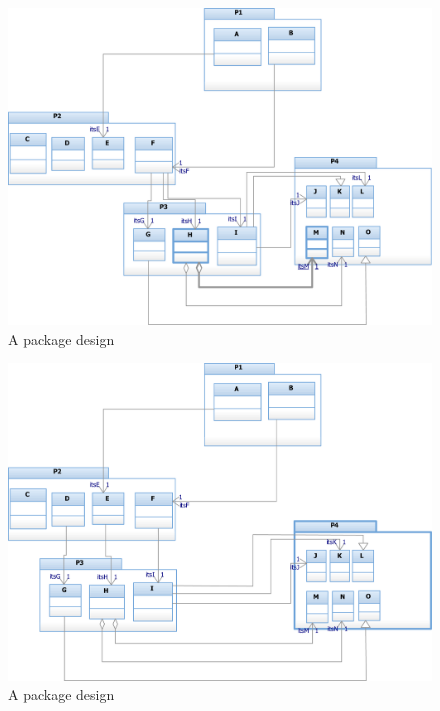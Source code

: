 \documentclass{article}
\begin{document}
\begin{enumerate}[label=\alph*.]
		\begin{figure}
			\includegraphics[width=\textwidth]{q1a-1.png}
			\caption{A package design}
			\label{q1a-1}
		\end{figure}
		\begin{figure}
			\includegraphics[width=\textwidth]{q1a-2.png}
			\caption{A package design}
			\label{q1a-2}
		\end{figure}


\end{enumerate}
\end{document}
